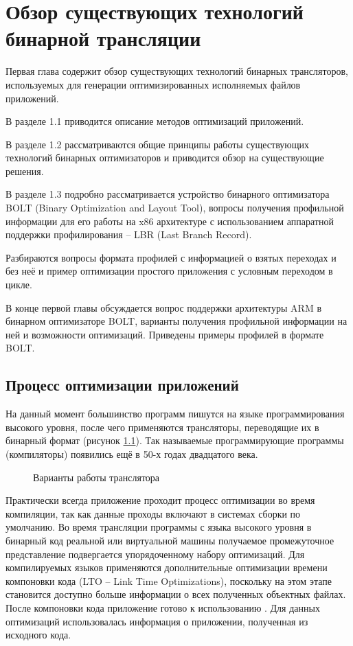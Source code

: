 \chapter{Обзор существующих технологий бинарной трансляции}\label{ch:ch1}
Первая глава содержит обзор существующих технологий бинарных трансляторов, используемых для генерации оптимизированных исполняемых файлов приложений.

В разделе 1.1 приводится описание методов оптимизаций приложений.

В разделе 1.2 рассматриваются общие принципы работы существующих технологий бинарных оптимизаторов и приводится обзор на существующие решения.

В разделе 1.3 подробно рассматривается устройство бинарного оптимизатора BOLT (Binary Optimization and Layout Tool), вопросы получения профильной информации для его работы на x86 архитектуре с использованием аппаратной поддержки профилирования -- LBR (Last Branch Record).

Разбираются вопросы формата профилей с информацией о взятых переходах и без неё и пример оптимизации простого приложения с условным переходом в цикле.

В конце первой главы обсуждается вопрос поддержки архитектуры ARM в бинарном оптимизаторе BOLT, варианты получения профильной информации на ней и возможности оптимизаций. Приведены примеры профилей в формате BOLT.

\section{Процесс оптимизации приложений}\label{sec:ch1/sec1}
На данный момент большинство программ пишутся на языке программирования высокого уровня, после чего применяются трансляторы, переводящие их в бинарный формат (рисунок \cref{fig:TransVar}). Так называемые программирующие программы (компиляторы) появились ещё в 50-х годах двадцатого века.

\begin{figure}[!h]
    \caption{Варианты работы транслятора}\label{fig:TransVar}
\end{figure}

Практически всегда приложение проходит процесс оптимизации во время компиляции, так как данные проходы включают в системах сборки по умолчанию. Во время трансляции программы с языка высокого уровня в бинарный код реальной или виртуальной машины получаемое промежуточное представление подвергается упорядоченному набору оптимизаций. Для компилируемых языков применяются дополнительные оптимизации времени компоновки кода (LTO – Link Time Optimizations), поскольку на этом этапе становится доступно больше информации о всех полученных объектных файлах. После компоновки кода приложение готово к использованию \cite{Wu1994}. Для данных оптимизаций использовалась информация о приложении, полученная из исходного кода.

